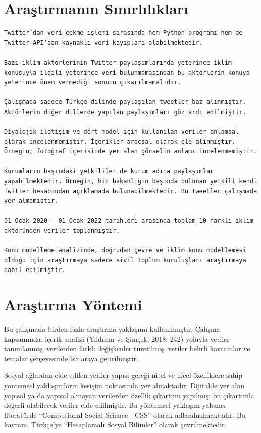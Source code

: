 \documentclass[
]{book}
\begin{document}
\hypertarget{araux15ftux131rmanux131n-sux131nux131rlux131lux131klarux131}{%
\section{Araştırmanın Sınırlılıkları}\label{araux15ftux131rmanux131n-sux131nux131rlux131lux131klarux131}}

\begin{verbatim}
Twitter’dan veri çekme işlemi sırasında hem Python programı hem de Twitter API’dan kaynaklı veri kayıpları olabilmektedir.

Bazı iklim aktörlerinin Twitter paylaşımlarında yeterince iklim konusuyla ilgili yeterince veri bulunmamasından bu aktörlerin konuya yeterince önem vermediği sonucu çıkarılmamalıdır.

Çalışmada sadece Türkçe dilinde paylaşılan tweetler baz alınmıştır. Aktörlerin diğer dillerde yapılan paylaşımları göz ardı edilmiştir.

Diyalojik iletişim ve dört model için kullanılan veriler anlamsal olarak incelenmemiştir. İçerikler araçsal olarak ele alınmıştır. Örneğin; fotoğraf içerisinde yer alan görselin anlamı incelenmemiştir.

Kurumların başındaki yetkililer de kurum adına paylaşımlar yapabilmektedir. Örneğin, bir bakanlığın başında bulunan yetkili kendi Twitter hesabından açıklamada bulunabilmektedir. Bu tweetler çalışmada yer almamıştır.

01 Ocak 2020 – 01 Ocak 2022 tarihleri arasında toplam 10 farklı iklim aktöründen veriler toplanmıştır.

Konu modelleme analizinde, doğrudan çevre ve iklim konu modellemesi olduğu için araştırmaya sadece sivil toplum kuruluşları araştırmaya dahil edilmiştir.
\end{verbatim}

\hypertarget{araux15ftux131rma-yuxf6ntemi}{%
\section{Araştırma Yöntemi}\label{araux15ftux131rma-yuxf6ntemi}}

Bu çalışmada birden fazla araştırma yaklaşımı kullanılmıştır. Çalışma kapsamında, içerik analizi (Yıldırım ve Şimşek, 2018: 242) yoluyla veriler tanımlanmış, verilerden farklı değişkenler türetilmiş, veriler belirli kavramlar ve temalar çerçevesinde bir araya getirilmiştir.

Sosyal ağlardan elde edilen veriler yapısı gereği nitel ve nicel özelliklere sahip yöntemsel yaklaşımların kesişim noktasında yer almaktadır. Dijitalde yer alan yapısal ya da yapısal olmayan verilerden özellik çıkartımı yapılmış; bu çıkartımla değerli olabilecek veriler elde edilmiştir. Bu yöntemsel yaklaşım yabancı literatürde ``Computional Social Science - CSS'' olarak adlandırılmaktadır. Bu kavram, Türkçe'ye ``Hesaplamalı Sosyal Bilimler'' olarak çevrilmektedir.
\end{document}
